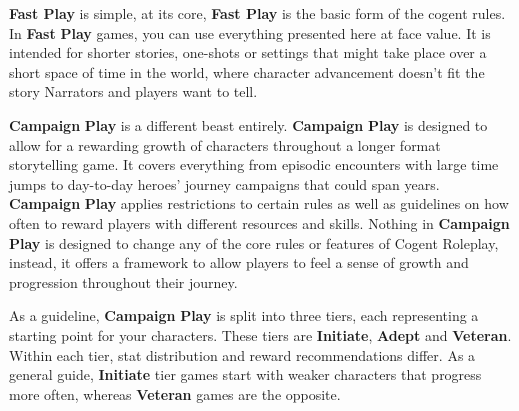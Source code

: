 \textbf{Fast Play} is simple, at its core, \textbf{Fast Play} is the basic form of the cogent rules. In \textbf{Fast} \textbf{Play} games, you can use everything presented here at face value. It is intended for shorter stories, one-shots or settings that might take place over a short space of time in the world, where character advancement doesn’t fit the story Narrators and players want to tell.

\textbf{Campaign} \textbf{Play} is a different beast entirely. \textbf{Campaign} \textbf{Play} is designed to allow for a rewarding growth of characters throughout a longer format storytelling game. It covers everything from episodic encounters with large time jumps to day-to-day heroes’ journey campaigns that could span years. \textbf{Campaign} \textbf{Play} applies restrictions to certain rules as well as guidelines on how often to reward players with different resources and skills. Nothing in \textbf{Campaign} \textbf{Play} is designed to change any of the core rules or features of Cogent Roleplay, instead, it offers a framework to allow players to feel a sense of growth and progression throughout their journey.

As a guideline, \textbf{Campaign} \textbf{Play} is split into three tiers, each representing a starting point for your characters. These tiers are \textbf{Initiate}, \textbf{Adept} and \textbf{Veteran}. Within each tier, stat distribution and reward recommendations differ. As a general guide, \textbf{Initiate} tier games start with weaker characters that progress more often, whereas \textbf{Veteran} games are the opposite.